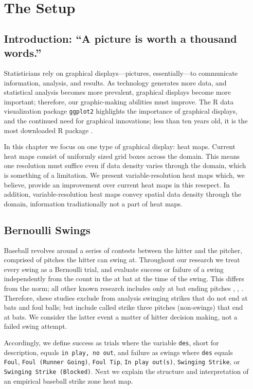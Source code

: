 \section{The Setup}
\subsection{Introduction: ``A picture is worth a thousand words.''}

Statisticians rely on graphical displays---pictures, essentially---to communicate information, analysis, and results. As technology generates more data, and statistical analysis becomes more prevalent, graphical displays become more important; therefore, our graphic-making abilities must improve. The R data visualization package \verb|ggplot2| highlights the importance of graphical displays, and the continued need for graphical innovations; less than ten years old, it is the most downloaded R package \citep{rdoc}.

In this chapter we focus on one type of graphical display: heat maps. Current heat maps consist of uniformly sized grid boxes across the domain. This means one resolution must suffice even if data density varies through the domain, which is something of a limitation. We present variable-resolution heat maps which, we believe, provide an improvement over current heat maps in this resepect. In addition, variable-resolution heat maps convey spatial data density through the domain, information tradiationally not a part of heat maps.

\subsection{Bernoulli Swings}

Baseball revolves around a series of contests between the hitter and the pitcher, comprised of pitches the hitter can swing at. Throughout our research we treat every swing as a Bernoulli trial, and evaluate success or failure of a swing independently from the count in the at bat at the time of the swing. This differs from the norm; all other known research includes only at bat ending pitches \citep{Cross2015}, \citep{Baumer2010}, \citep{Fast2011}. Therefore, shese studies exclude from analysis swinging strikes that do not end at bats and foul balls; but include called strike three pitches (non-swings) that end at bats. We consider the latter event a matter of hitter decision making, not a failed swing attempt.  

Accordingly, we define success as trials where the variable \verb|des|, short for description, equals \verb|in play, no out|, and failure as swings where \verb|des| equals \verb|Foul|, \verb|Foul (Runner Going)|, \verb|Foul Tip|, \verb|In play out(s)|, \verb|Swinging Strike|, or \\ \verb|Swinging Strike (Blocked)|. Next we explain the structure and interpretation of an empirical baseball strike zone heat map.

